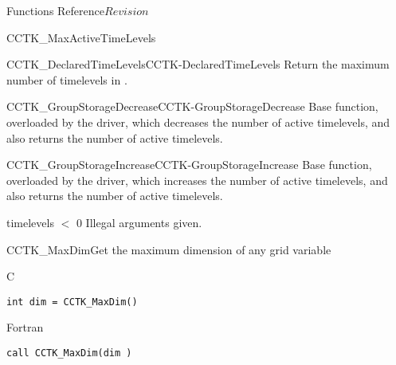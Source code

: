 \begin{cactuspart}{ Functions Reference}{}{$Revision$}
\begin{FunctionDescription}{CCTK\_MaxActiveTimeLevels}
\begin{SeeAlsoSection}
\begin{SeeAlso2}{CCTK\_DeclaredTimeLevels}{CCTK-DeclaredTimeLevels}
Return the maximum number of timelevels in .
\end{SeeAlso2}
\begin{SeeAlso2}{CCTK\_GroupStorageDecrease}{CCTK-GroupStorageDecrease}
Base function, overloaded by the driver, which decreases the number of
active timelevels, and also returns the number of active timelevels.
\end{SeeAlso2}
\begin{SeeAlso2}{CCTK\_GroupStorageIncrease}{CCTK-GroupStorageIncrease}
Base function, overloaded by the driver, which increases the number of
active timelevels, and also returns the number of active timelevels.
\end{SeeAlso2}
\end{SeeAlsoSection}

\begin{ErrorSection}
\begin{Error}{timelevels $<$ 0}
Illegal arguments given.
\end{Error}
\end{ErrorSection}

\end{FunctionDescription}



\begin{FunctionDescription}{CCTK\_MaxDim}{Get the maximum dimension of any grid variable }
\label{CCTK-MaxDim}
\begin{SynopsisSection}
\begin{Synopsis}{C}
\begin{verbatim}int dim = CCTK_MaxDim()\end{verbatim}
\end{Synopsis}
\begin{Synopsis}{Fortran}
\begin{verbatim}call CCTK_MaxDim(dim )


\end{verbatim}
\end{Synopsis}
\end{SynopsisSection}
\end{FunctionDescription}
\end{cactuspart}
